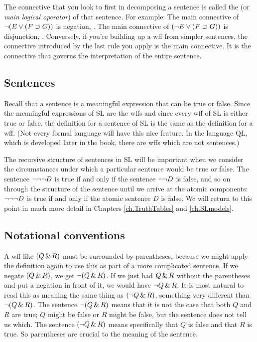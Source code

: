 The connective that you look to first in decomposing a sentence is called the  (or \emph{main logical operator}) of that sentence. For example: The main connective of $\neg (E \vee (F \supset G))$ is negation, \enot. The main connective of $(\neg E \vee (F \supset G))$ is disjunction, \eor. Conversely, if you're building up a wff from simpler sentences, the connective introduced by the last rule you apply is the main connective. It is the connective that governs the interpretation of the entire sentence.


\subsection{Sentences}
Recall that a sentence is a meaningful expression that can be true or false. Since the meaningful expressions of SL are the wffs and since every wff of SL is either true or false, the definition for a sentence of SL is the same as the definition for a wff. (Not every formal language will have this nice feature. In the language QL, which is developed later in the book, there are wffs which are not sentences.)

The recursive structure of sentences in SL will be important when we consider the circumstances under which a particular sentence would be true or false. The sentence $\neg \neg \neg D$ is true if and only if the sentence $\neg \neg D$ is false, and so on through the structure of the sentence until we arrive at the atomic components: $\neg \neg \neg D$ is true if and only if the atomic sentence $D$ is false. We will return to this point in much more detail in Chapters \ref{ch.TruthTables} and \ref{ch.SLmodels}.



\subsection{Notational conventions}
\label{SLconventions}
A wff like $(Q \,\&\, R)$ must be surrounded by parentheses, because we might apply the definition again to use this as part of a more complicated sentence. If we negate $(Q \,\&\, R)$, we get $\neg(Q \,\&\, R)$. If we just had $Q \,\&\, R$ without the parentheses and put a negation in front of it, we would have $\neg Q \,\&\, R$. It is most natural to read this as meaning the same thing as $(\neg Q \,\&\, R)$, something very different than $\neg(Q\,\&\, R)$. The sentence $\neg(Q \,\&\, R)$ means that it is not the case that both $Q$ and $R$ are true; $Q$ might be false or $R$ might be false, but the sentence does not tell us which. The sentence $(\neg Q \,\&\, R)$ means specifically that $Q$ is false and that $R$ is true. So parentheses are crucial to the meaning of the sentence.

